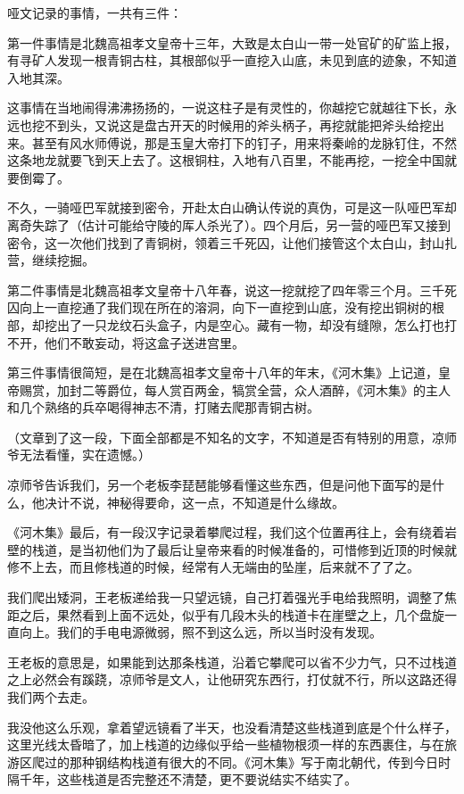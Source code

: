 哑文记录的事情，一共有三件：

第一件事情是北魏高祖孝文皇帝十三年，大致是太白山一带一处官矿的矿监上报，有寻矿人发现一根青铜古柱，其根部似乎一直挖入山底，未见到底的迹象，不知道入地其深。

这事情在当地闹得沸沸扬扬的，一说这柱子是有灵性的，你越挖它就越往下长，永远也挖不到头，又说这是盘古开天的时候用的斧头柄子，再挖就能把斧头给挖出来。甚至有风水师傅说，那是玉皇大帝打下的钉子，用来将秦岭的龙脉钉住，不然这条地龙就要飞到天上去了。这根铜柱，入地有八百里，不能再挖，一挖全中国就要倒霉了。

不久，一骑哑巴军就接到密令，开赴太白山确认传说的真伪，可是这一队哑巴军却离奇失踪了（估计可能给守陵的厍人杀光了）。四个月后，另一营的哑巴军又接到密令，这一次他们找到了青铜树，领着三千死囚，让他们接管这个太白山，封山扎营，继续挖掘。

第二件事情是北魏高祖孝文皇帝十八年春，说这一挖就挖了四年零三个月。三千死囚向上一直挖通了我们现在所在的溶洞，向下一直挖到山底，没有挖出铜树的根部，却挖出了一只龙纹石头盒子，内是空心。藏有一物，却没有缝隙，怎么打也打不开，他们不敢妄动，将这盒子送进宫里。

第三件事情很简短，是在北魏高祖孝文皇帝十八年的年末，《河木集》上记道，皇帝赐赏，加封二等爵位，每人赏百两金，犒赏全营，众人酒醉，《河木集》的主人和几个熟络的兵卒喝得神志不清，打赌去爬那青铜古树。

（文章到了这一段，下面全部都是不知名的文字，不知道是否有特别的用意，凉师爷无法看懂，实在遗憾。）

凉师爷告诉我们，另一个老板李琵琶能够看懂这些东西，但是问他下面写的是什么，他决计不说，神秘得要命，这一点，不知道是什么缘故。

《河木集》最后，有一段汉字记录着攀爬过程，我们这个位置再往上，会有绕着岩壁的栈道，是当初他们为了最后让皇帝来看的时候准备的，可惜修到近顶的时候就修不上去，而且修栈道的时候，经常有人无端由的坠崖，后来就不了了之。

我们爬出矮洞，王老板递给我一只望远镜，自己打着强光手电给我照明，调整了焦距之后，果然看到上面不远处，似乎有几段木头的栈道卡在崖壁之上，几个盘旋一直向上。我们的手电电源微弱，照不到这么远，所以当时没有发现。

王老板的意思是，如果能到达那条栈道，沿着它攀爬可以省不少力气，只不过栈道之上必然会有蹊跷，凉师爷是文人，让他研究东西行，打仗就不行，所以这路还得我们两个去走。

我没他这么乐观，拿着望远镜看了半天，也没看清楚这些栈道到底是个什么样子，这里光线太昏暗了，加上栈道的边缘似乎给一些植物根须一样的东西裹住，与在旅游区爬过的那种钢结构栈道有很大的不同。《河木集》写于南北朝代，传到今日时隔千年，这些栈道是否完整还不清楚，更不要说结实不结实了。

